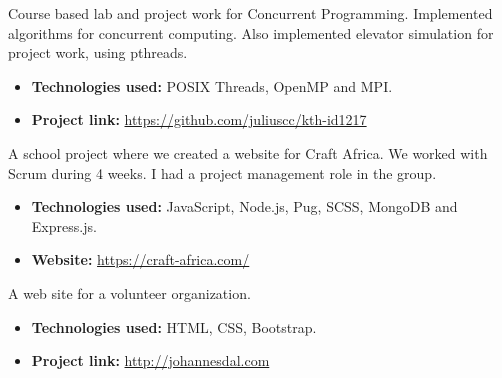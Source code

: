 
Course based lab and project work for Concurrent Programming. Implemented algorithms for concurrent computing. Also implemented elevator simulation for project work, using pthreads.

\vspace{6pt}

\begin{itemize}
    \item \textbf{Technologies used:} POSIX Threads, OpenMP and MPI.
    \item \textbf{Project link:} \href{https://github.com/juliuscc/kth-id1217}{https://github.com/juliuscc/kth-id1217}
\end{itemize}

\divider


A school project where we created a website for Craft Africa. We worked with Scrum during 4 weeks. I had a project management role in the group.

\vspace{6pt}

\begin{itemize}
    \item \textbf{Technologies used:} JavaScript, Node.js, Pug, SCSS, MongoDB and Express.js.
    \item \textbf{Website:} \href{https://craft-africa.com/}{https://craft-africa.com/}
\end{itemize}

\divider

A web site for a volunteer organization.

\vspace{6pt}

\begin{itemize}
    \item \textbf{Technologies used:} HTML, CSS, Bootstrap.
    \item \textbf{Project link:} \href{http://johannesdal.com}{http://johannesdal.com}
\end{itemize}
